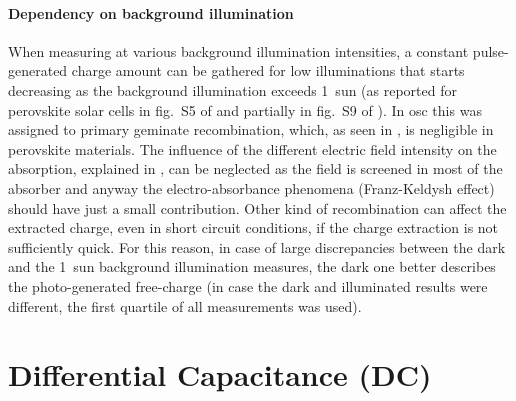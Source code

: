 	\paragraph{Dependency on background illumination}\label{tpc_intensity}
	When measuring  at various background illumination intensities, a constant pulse\hyp{}generated charge amount can be gathered for low illuminations that starts decreasing as the background illumination exceeds \SI{1}{sun} (as reported for perovskite solar cells in fig.~S5 of \cite{Du2018} and partially in fig.~S9 of \cite{Wheeler2017}).
	In \gls{osc} this was assigned to primary geminate recombination, which, as seen in , is negligible in perovskite materials.
	The influence of the different electric field intensity on the absorption, explained in , can be neglected as the field is screened in most of the absorber and anyway the electro\hyp{}absorbance phenomena (Franz\hyp{}Keldysh effect) should have just a small contribution.
	Other kind of recombination can affect the extracted charge, even in short circuit conditions, if the charge extraction is not sufficiently quick.
	For this reason, in case of large discrepancies between the dark and the \SI{1}{sun} background illumination measures, the dark one better describes the photo\hyp{}generated free\hyp{}charge (in case the dark and illuminated results were different, the first quartile of all  measurements was used).

	\FloatBarrier
	\newpage
\section{Differential Capacitance (DC)}\label{characterization_dc}

